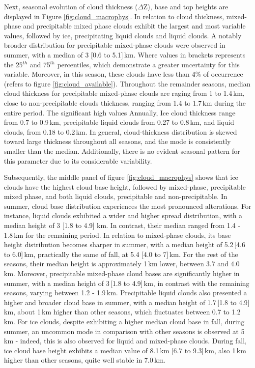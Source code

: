 \documentclass[journal abbreviation, manuscript]{copernicus}
\begin{document}
Next, seasonal evolution of cloud thickness ($\Delta$Z), base and top heights are displayed in Figure \ref{fig:cloud_macrophys}. In relation to cloud thickness, mixed-phase and precipitable mixed phase clouds exhibit the largest and most variable values, followed by ice, precipitating liquid clouds and liquid clouds. A notably broader distribution for precipitable mixed-phase clouds were observed in summer, with a median of 3 [0.6 to 5.1]\,km. Where values in brackets represents the 25$^{th}$ and 75$^{th}$ percentiles, which demonstrate a greater uncertainty for this variable. Moreover, in this season, these clouds have less than 4\% of occurrence (refers to figure \ref{fig:cloud_available}). Throughout the remainder seasons, median cloud thickness for precipitable mixed-phase clouds are raging from 1 to 1.4\,km, close to non-precipitable clouds thickness, ranging from 1.4 to 1.7\,km during the entire period.
The significant high values 
Annually, Ice cloud thickness range from 0.7 to 0.9\,km, precipitable liquid clouds from 0.27 to 0.8\,km, and liquid clouds, from 0.18 to 0.2\,km. In general, cloud-thickness distribution is skewed toward large thickness throughout all seasons, and the mode is consistently smaller than the median. Additionally, there is no evident seasonal pattern for this parameter due to its considerable variability.

Subsequently, the middle panel of figure \ref{fig:cloud_macrophys} shows that ice clouds have the highest cloud base height, followed by mixed-phase, precipitable mixed phase, and both liquid clouds, precipitable and non-precipitable. In summer, cloud base distribution experiences the most pronounced alterations. For instance, liquid clouds exhibited a wider and higher spread distribution, with a median height of 3 [1.8 to 4.9] km. In contrast, their median ranged from 1.4 - 1.8\,km for the remaining period. In relation to mixed-phase clouds, its base height distribution becomes sharper in summer, with a median height of 5.2\,[4.6 to 6.0]\,km, practically the same of fall, at 5.4 [4.0 to 7]\,km. For the rest of the seasons, their median height is approximately 1\,km lower, between 3.7 and 4.0\,km. 
Moreover, precipitable mixed-phase cloud bases are significantly higher in summer, with a median height of 3\,[1.8 to 4.9]\,km, in contrast with the remaining seasons, varying between 1.2 - 1.9\,km. 
Precipitable liquid clouds also presented a higher and broader cloud base in summer, with a median height of 1.7\,[1.8 to 4.9]\,km, about 1\,km higher than other seasons, which fluctuates between 0.7 to 1.2\,km.
For ice clouds, despite exhibiting a higher median cloud base in fall, during summer, an uncommon mode in comparison with other seasons is observed at 5\,km - indeed, this is also observed for liquid and mixed-phase clouds. During fall, ice cloud base height exhibits a median value of 8.1\,km [6.7 to 9.3]\,km, also 1\,km higher than other seasons, quite well stable in 7.0\,km. 
\end{document}
